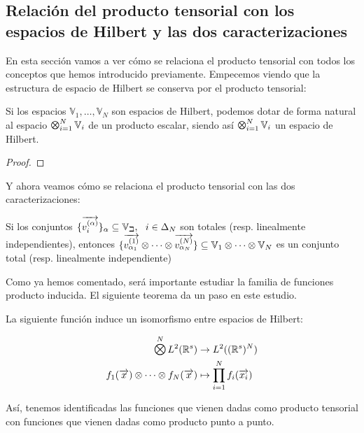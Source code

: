 \subsection{Relación del producto tensorial con los espacios de Hilbert y las dos caracterizaciones}

En esta sección vamos a ver cómo se relaciona el producto tensorial con todos los conceptos que hemos introducido previamente. Empecemos viendo que la estructura de espacio de Hilbert se conserva por el producto tensorial:

\begin{proposicion}

	Si los espacios $\mathbb{V}_1, \ldots, \mathbb{V}_N$ son espacios de Hilbert, podemos dotar de forma natural al espacio $\MediumOtimes_{i = 1}^N \mathbb{V}_i$ de un producto escalar, siendo así $\MediumOtimes_{i = 1}^N \mathbb{V}_i$ un espacio de Hilbert.

\end{proposicion}

\begin{proof}


\end{proof}

Y ahora veamos cómo se relaciona el producto tensorial con las dos caracterizaciones:

\begin{proposicion}
	Si los conjuntos $\{\overrightarrow{v_i^{(\alpha)}}\}_{\alpha} \subseteq \mathbb{V_i}, \ \  i \in \Delta_{N}$ son totales (resp. linealmente independientes), entonces $\{ \overrightarrow{v^{(1)}_{\alpha_1}} \otimes \cdots \otimes  \overrightarrow{v^{(N)}_{\alpha_N}}  \} \subseteq \mathbb{V}_1 \otimes \cdots \otimes \mathbb{V}_N$ es un conjunto total (resp. linealmente independiente)
\end{proposicion}

Como ya hemos comentado, será importante estudiar la familia de funciones producto inducida. El siguiente teorema da un paso en este estudio.

\begin{teorema}
	La siguiente función induce un isomorfismo entre espacios de Hilbert:

	\begin{equation}
		\begin{split}
			\MediumOtimes^{N} L^2(\R^s) &\to L^2((\R^s)^N) \\
			f_1(\nv{x}) \otimes \cdots \otimes f_N(\nv{x}) &\mapsto \prod_{i = 1}^N f_i(\nv{x_i})
		\end{split}
	\end{equation}

	Así, tenemos identificadas las funciones que vienen dadas como producto tensorial con funciones que vienen dadas como producto punto a punto.
\end{teorema}
